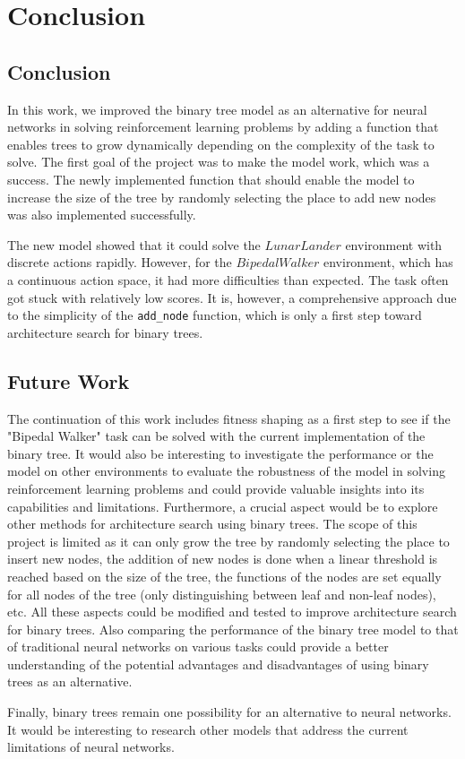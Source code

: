 
\chapter{Conclusion}
\label{ch:conclusions}

\section{Conclusion}
In this work, we improved the binary tree model as an alternative for neural networks in solving reinforcement learning problems by adding a function that enables trees to grow dynamically depending on the complexity of the task to solve. The first goal of the project was to make the model work, which was a success. The newly implemented function that should enable the model to increase the size of the tree by randomly selecting the place to add new nodes was also implemented successfully.

The new model showed that it could solve the $Lunar Lander$ environment with discrete actions rapidly. However, for the $Bipedal Walker$ environment, which has a continuous action space, it had more difficulties than expected. The task often got stuck with relatively low scores. It is, however, a comprehensive approach due to the simplicity of the \texttt{add\_node} function, which is only a first step toward architecture search for binary trees. 

\section{Future Work}
The continuation of this work includes fitness shaping as a first step to see if the "Bipedal Walker" task can be solved with the current implementation of the binary tree. It would also be interesting to investigate the performance or the model on other environments to evaluate the robustness of the model in solving reinforcement learning problems and could provide  valuable insights into its capabilities and limitations. Furthermore, a crucial aspect would be to explore other methods for architecture search using binary trees. The scope of this project is limited as it can only grow the tree by randomly selecting the place to insert new nodes, the addition of new nodes is done when a linear threshold is reached based on the size of the tree, the functions of the nodes are set equally for all nodes of the tree (only distinguishing between leaf and non-leaf nodes), etc. All these aspects could be modified and tested to improve architecture search for binary trees. Also comparing the performance of the binary tree model to that of traditional neural networks on various tasks could provide a better understanding of the potential advantages and disadvantages of using binary trees as an alternative.

Finally, binary trees remain one possibility for an alternative to neural networks. It would be interesting to research other models that address the current limitations of neural networks.